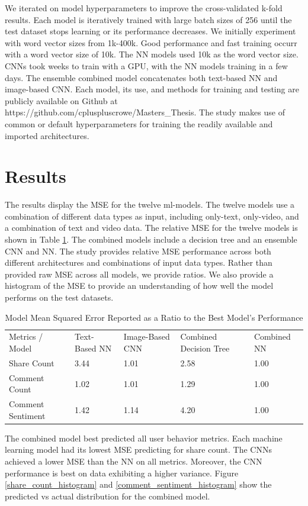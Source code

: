 \documentclass[mksc,blindrev]{informs3} %
\begin{document}
We iterated on model hyperparameters to improve the cross-validated k-fold results. Each model is iteratively trained with large batch sizes of 256 until the test dataset stops learning or its performance decreases. We initially experiment with word vector sizes from 1k-400k. Good performance and fast training occurr with a word vector size of 10k. The NN models used 10k as the word vector size. CNNs took weeks to train with a GPU, with the NN models training in a few days. The ensemble combined model concatenates both text-based NN and image-based CNN. Each model, its use, and methods for training and testing are publicly available on Github at https://github.com/cpluspluscrowe/Masters\_Thesis. The study makes use of common or default hyperparameters for training the readily available and imported architectures.

\section{Results}

The results display the MSE for the twelve ml-models. The twelve models use a combination of different data types as input, including only-text, only-video, and a combination of text and video data. The relative MSE for the twelve models is shown in Table \ref{mse_ratios}. The combined models include a decision tree and an ensemble CNN and NN. The study provides relative MSE performance across both different architectures and combinations of input data types. Rather than provided raw MSE across all models, we provide ratios.  We also provide a histogram of the MSE to provide an understanding of how well the model performs on the test datasets.

\begin{table}[]
\centering
\begin{tabular}{lllll}
Metrics / Model & Text-Based NN & Image-Based CNN & Combined Decision Tree & Combined NN \\
Share Count       & 3.44 & 1.01 & 2.58 & 1.00 \\
Comment Count     & 1.02 & 1.01 & 1.29 & 1.00 \\
Comment Sentiment & 1.42 & 1.14 & 4.20 & 1.00
\end{tabular}
\caption{\label{mse_ratios}Model Mean Squared Error Reported as a Ratio to the Best Model's Performance}
\end{table}

The combined model best predicted all user behavior metrics. Each machine learning model had its lowest MSE predicting for share count. The CNNs achieved a lower MSE than the NN on all metrics. Moreover, the CNN performance is best on data exhibiting a higher variance. Figure \ref{share_count_histogram} and \ref{comment_sentiment_histogram} show the predicted vs actual distribution for the combined model.
\end{document}
